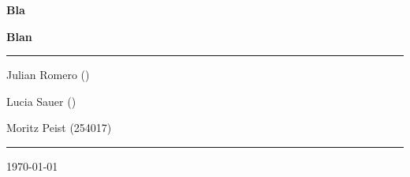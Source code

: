 \documentclass[11pt]{article}
\begin{document}
\begin{titlepage}
	\centering
	\par\vspace{0.75cm}
	{\huge\bfseries Bla\par}
    {\large\bfseries Blan\par}
	\vspace{0.25cm}
    \noindent\rule{\textwidth}{1pt}
    {\Large Julian Romero ()\par}
    {\Large Lucia Sauer ()\par}
	{\Large Moritz Peist (254017)\par}
    \noindent\rule{\textwidth}{1pt}
    \vfill
    \begin{abstract}
        \noindent
        bla bla.
    \end{abstract}
	\vfill
	{\large \today\par}
\end{titlepage}

\tableofcontents
\thispagestyle{empty}

\newpage
\addtocounter{page}{-1}

\newpage

\newpage

\newpage

\newpage

\newpage


\newpage
\printbibliography[heading=bibintoc,title={References}]

\newpage

\end{document}
